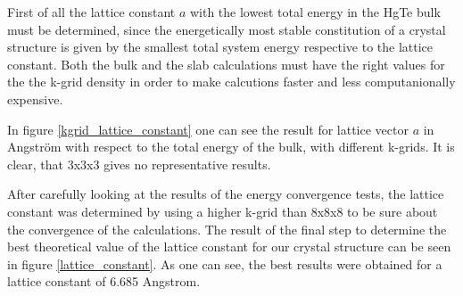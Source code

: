 	First of all the lattice constant $a$ with the lowest total energy in the HgTe bulk must be determined, since the energetically most stable constitution of a crystal structure is given by the smallest total system energy respective to the lattice constant.  
	Both the bulk and the slab calculations must have the right values for the the k-grid density in order to make calcutions faster and less computanionally expensive. 		

	In figure \ref{kgrid_lattice_constant} one can see the result for lattice vector $a$ in Angström with respect to the total energy of the bulk, with different k-grids. It is clear, that 3x3x3 gives no representative results. 

	After carefully looking at the results of the energy convergence tests, the lattice constant was determined by using a higher k-grid than 8x8x8 to be sure about the convergence of the calculations. The result of the final step to determine the best theoretical value of the lattice constant for our crystal structure can be seen in figure \ref{lattice_constant}.
	As one can see, the best results were obtained for a lattice constant of 6.685 Angstrom.

